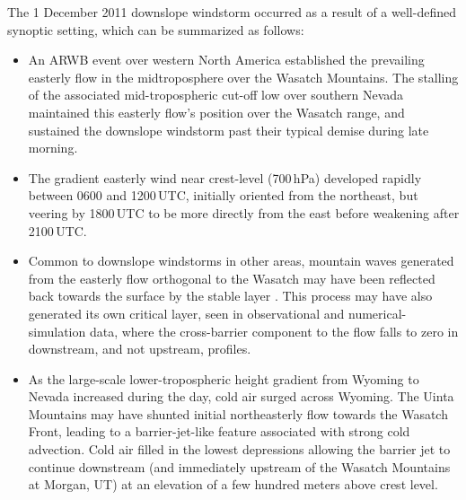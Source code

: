 \documentclass[pdftex,12pt]{article}
\begin{document}
The 1 December 2011 downslope windstorm occurred as a result of a well-defined synoptic setting, which can be summarized as follows:

\begin{itemize}
\item An ARWB event over western North America established the prevailing easterly flow in the midtroposphere over the Wasatch Mountains. The stalling of the associated mid-tropospheric cut-off low over southern Nevada maintained this easterly flow's position over the Wasatch range, and sustained the downslope windstorm past their typical demise during late morning.

\item The gradient easterly wind near crest-level (700\,hPa) developed rapidly between 0600 and 1200\,UTC, initially oriented from the northeast, but veering by 1800\,UTC to be more directly from the east before weakening after 2100\,UTC.

\item Common to downslope windstorms in other areas, mountain waves generated from the easterly flow orthogonal to the Wasatch may have been reflected back towards the surface by the stable layer \citep{Smith1985}. This process may have also generated its own critical layer, seen in observational and numerical-simulation data, where the cross-barrier component to the flow falls to zero \citep{Peltier1979} in downstream, and not upstream, profiles.

\item As the large-scale lower-tropospheric height gradient from Wyoming to Nevada increased during the day, cold air surged across Wyoming. The Uinta Mountains may have shunted initial northeasterly flow towards the Wasatch Front, leading to a barrier-jet-like feature associated with strong cold advection. Cold air filled in the lowest depressions allowing the barrier jet to continue downstream (and immediately upstream of the Wasatch Mountains at Morgan, UT) at an elevation of a few hundred meters above crest level.
\end{itemize}
\end{document}
